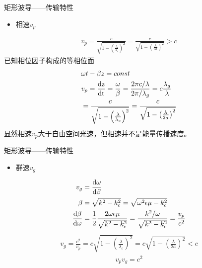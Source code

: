\begin{frame}{矩形波导——传输特性}
    \begin{itemize}
        \item 相速$v_p$
    \end{itemize}
    \begin{align}
        v_p=\frac{c}{\sqrt{1-\left(\frac{\lambda}{\lambda_c}\right)^2}}=\frac{c}{\sqrt{1-\left(\frac{\lambda}{2a}\right)^2}}>c
    \end{align}
    已知相位因子构成的等相位面
    \begin{align*}
         & \omega t-\beta z=const                                                                                            \\
         & v_p=\frac{\rm{d}z}{\rm{d}t}=\frac{\omega}{\beta}=\frac{2\pi c/\lambda}{2\pi/\lambda_g}=c\frac{\lambda_g}{\lambda} \\
         & =\frac{c}{\sqrt{1-\left(\frac{\lambda}{\lambda_c}\right)^2}}=\frac{c}{\sqrt{1-\left(\frac{\lambda}{2a}\right)^2}}
    \end{align*}
    显然相速$v_p$大于自由空间光速，但相速并不是能量传播速度。
\end{frame}

\begin{frame}{矩形波导——传输特性}
    \begin{itemize}
        \item 群速$v_g$
    \end{itemize}
    \begin{align*}
        v_g                              & =\frac{\rm{d}\omega}{\rm{d}\beta}                                                                           \\
        \beta                            & = \sqrt{k^2-k_c^2}=\sqrt{\omega^2\epsilon\mu-k_c^2}                                                         \\
        \frac{\rm{d}\beta}{\rm{d}\omega} & =\frac{1}{2}\frac{2\omega\epsilon\mu}{\sqrt{k^2-k_c^2}}=\frac{k^2/\omega}{\sqrt{k^2-k_c^2}}=\frac{v_p}{c^2}
    \end{align*}
    \begin{align}
        v_g = \frac{c^2}{v_p}=c\sqrt{1-\left(\frac{\lambda}{\lambda_c}\right)^2}=c\sqrt{1-\left(\frac{\lambda}{2a}\right)^2}<c
    \end{align}
    \begin{align}
        v_p v_g=c^2
    \end{align}
\end{frame}

